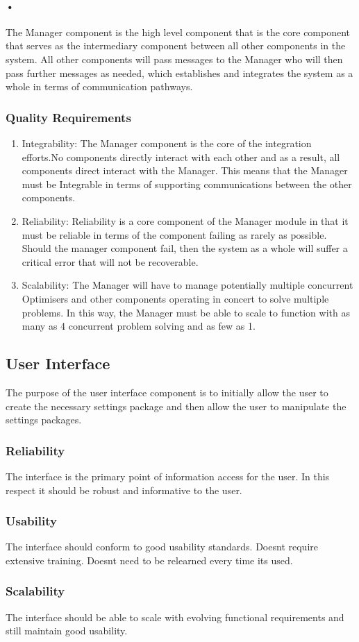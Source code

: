 \documentclass[11pt]{article}
\begin{document}
\paragraph{•}
The Manager component is the high level component that is the core component that serves as the intermediary component between all other components in the system. All other components will pass messages to the Manager who will then pass further messages as needed, which establishes and integrates the system as a whole in terms of communication pathways.
\subsubsection{Quality Requirements}
\begin{enumerate}
\item Integrability: The Manager component is the core of the integration efforts.No components directly interact with each other and as a result, all components direct interact with the Manager. This means that the Manager must be Integrable in terms of supporting communications between the other components.
\item Reliability: Reliability is a core component of the Manager module in that it must be reliable in terms of the component failing as rarely as possible. Should the manager component fail, then the system as a whole will suffer a critical error that will not be recoverable.
\item Scalability: The Manager will have to manage potentially multiple concurrent Optimisers and other components operating in concert to solve multiple problems. In this way, the Manager must be able to scale to function with as many as 4 concurrent problem solving and as few as 1.
\end{enumerate}

\subsection{User Interface}
The purpose of the user interface component is to initially allow the user to create the necessary settings package and then allow the user to manipulate the settings packages.
\subsubsection{Reliability}
The interface is the primary point of information access for the user. In this respect it should be robust and informative to the user.
\subsubsection{Usability}
The interface should conform to good usability standards. Doesnt require extensive training. Doesnt need to be relearned every time its used.
\subsubsection{Scalability}
The interface should be able to scale with evolving functional requirements and still maintain good usability. 
\end{document}
